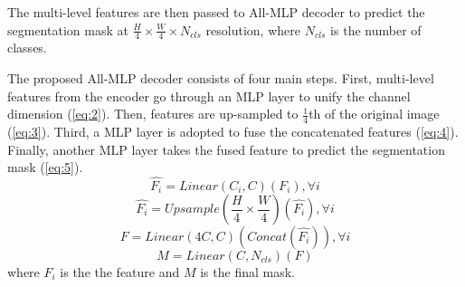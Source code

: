 The multi-level features are then passed to All-MLP decoder to predict the segmentation mask at $\frac{H}{4}\times \frac{W}{4}\times N_{cls}$ resolution, where $N_{cls}$ is the number of classes.

The proposed All-MLP decoder consists of four main steps. First, multi-level features from
the encoder go through an MLP layer to unify the channel dimension (\ref{eq:2}). Then, features are up-sampled to $\frac{1}{4}$th of the original image (\ref{eq:3}). Third, a MLP layer is adopted to fuse the concatenated features (\ref{eq:4}). Finally, another MLP layer takes the fused feature to predict the segmentation mask (\ref{eq:5}).
\begin{equation} \label{eq:2}
\hat{F_i} = Linear(C_i, C)(F_i), \forall i
\end{equation}
\begin{equation} \label{eq:3}
\hat{F_i} = Upsample(\frac{H}{4}\times \frac{W}{4})(\hat{F_i}), \forall i
\end{equation}
\begin{equation} \label{eq:4}
F = Linear(4C, C)(Concat(\hat{F_i})), \forall i
\end{equation}
\begin{equation} \label{eq:5}
M = Linear(C, N_{cls})(F)
\end{equation}
where $F_i$ is the the feature and $M$ is the final mask.
